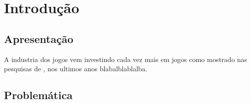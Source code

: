 \chapter{Introdução}

\section{Apresentação}
A industria dos jogos vem investindo cada vez mais em jogos
como mostrado nas pesquisas de \cite{entertainment2017essential}, nos ultimos
anos blabalblablalba.

\section{Problemática}







